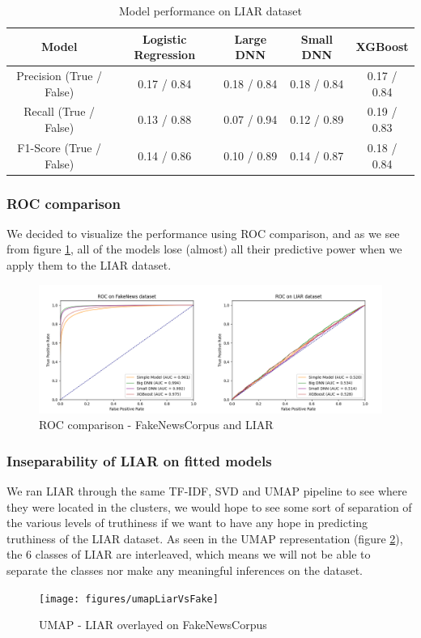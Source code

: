 \begin{table}[htpb]
  \centering
  \caption{Model performance on LIAR dataset}
  \label{tab:liarperformance}
  \begin{tabular}{c|cccc}
    Model & Logistic Regression & Large DNN & Small DNN & XGBoost \\ \hline
    Precision (True / False) & 0.17 / 0.84  & 0.18 / 0.84 & 0.18 / 0.84 & 0.17 / 0.84 \\ \hline
    Recall (True / False) & 0.13 / 0.88 & 0.07 / 0.94 & 0.12 / 0.89 & 0.19 / 0.83 \\ \hline
    F1-Score (True / False) & 0.14 / 0.86 & 0.10 / 0.89 & 0.14 / 0.87 & 0.18 / 0.84 \\ \hline
  \end{tabular}
\end{table}

\subsubsection{ROC comparison}
We decided to visualize the performance using ROC comparison, and as we see from figure \ref{fig:roc}, all of the models lose
(almost) all their predictive power when we apply them to the LIAR dataset.

\begin{figure}[htpb]
  \centering
  \includegraphics[width=1\textwidth]{figures/ROC_combined}
  \caption{ROC comparison - FakeNewsCorpus and LIAR}
  \label{fig:roc}
\end{figure}


\subsubsection{Inseparability of LIAR on fitted models}
We ran LIAR through the same TF-IDF, SVD and UMAP pipeline to see where they were located in the clusters, we would hope
to see some sort of separation of the various levels of truthiness if we want to have any hope in predicting truthiness
of the LIAR dataset. As seen in the UMAP representation (figure \ref{fig:liarvsfake}), the 6 classes of LIAR are interleaved, which means we will not be able to separate the classes nor make any meaningful inferences on the dataset.

\begin{figure}[htpb]
  \centering
  \texttt{[image: figures/umapLiarVsFake]}
  \caption{UMAP - LIAR overlayed on FakeNewsCorpus}
  \label{fig:liarvsfake}
\end{figure}

